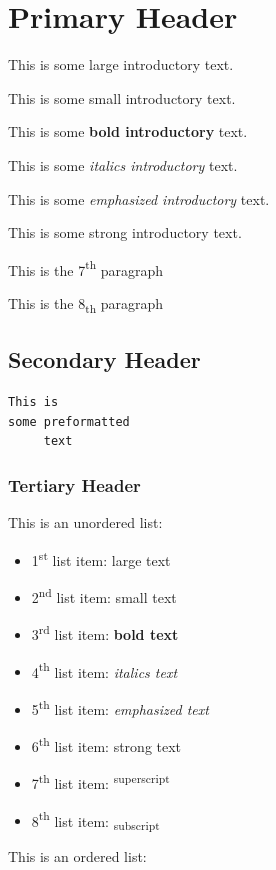 \documentclass[12pt]{article}
\begin{document}
\section{Primary Header}This is some {\Large large introductory} text.

This is some {\scriptsize small introductory} text.

This is some {\textbf{bold introductory}} text.

This is some {\textit{italics introductory}} text.

This is some {\emph{emphasized introductory}} text.

This is some {\textmd{strong introductory}} text.

This is the 7{\textsuperscript{th}} paragraph

This is the 8{\textsubscript{th}} paragraph

\subsection{Secondary Header}\begin{verbatim}
This is
some preformatted
     text
\end{verbatim}\subsubsection{Tertiary Header}This is an unordered list:

\begin{itemize}
\item 1{\textsuperscript{st}} list item: {\Large large text}
\item 2{\textsuperscript{nd}} list item: {\scriptsize small text}
\item 3{\textsuperscript{rd}} list item: {\textbf{bold text}}
\item 4{\textsuperscript{th}} list item: {\textit{italics text}}
\item 5{\textsuperscript{th}} list item: {\emph{emphasized text}}
\item 6{\textsuperscript{th}} list item: {\textmd{strong text}}
\item 7{\textsuperscript{th}} list item: {\textsuperscript{superscript}}
\item 8{\textsuperscript{th}} list item: {\textsubscript{subscript}}
\end{itemize}
This is an ordered list:
\end{document}
